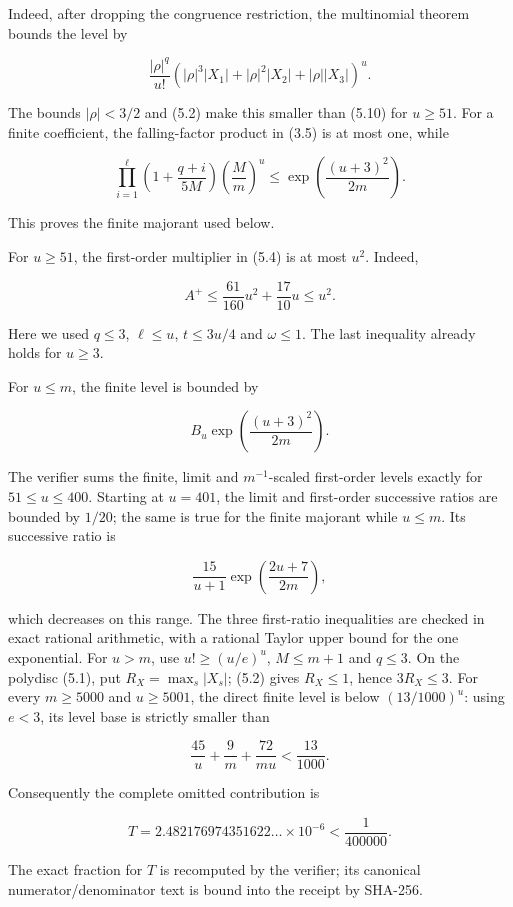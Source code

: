 \documentclass[
  11pt,
  a4paper,
]{article}
\begin{document}
Indeed, after dropping the congruence restriction, the multinomial
theorem bounds the level by

\[
\frac{|\rho|^q}{u!}
\left(|\rho|^3|X_1|+|\rho|^2|X_2|+|\rho||X_3|\right)^u.
\]

The bounds \(|\rho|<3/2\) and (5.2) make this smaller than (5.10) for
\(u\ge51\). For a finite coefficient, the falling-factor product in
(3.5) is at most one, while

\[
\prod_{i=1}^{\ell}\left(1+\frac{q+i}{5M}\right)
\left(\frac Mm\right)^u
\le
\exp\!\left(\frac{(u+3)^2}{2m}\right).
\]

This proves the finite majorant used below.

For \(u\ge51\), the first-order multiplier in (5.4) is at most \(u^2\).
Indeed,

\[
A^+\le \frac{61}{160}u^2+\frac{17}{10}u\le u^2.
\tag{5.11}
\]

Here we used \(q\le3\), \(\ell\le u\), \(t\le3u/4\) and \(\omega\le1\).
The last inequality already holds for \(u\ge3\).

For \(u\le m\), the finite level is bounded by

\[
B_u\exp\!\left(\frac{(u+3)^2}{2m}\right).
\tag{5.12}
\]

The verifier sums the finite, limit and \(m^{-1}\)-scaled first-order
levels exactly for \(51\le u\le400\). Starting at \(u=401\), the limit
and first-order successive ratios are bounded by \(1/20\); the same is
true for the finite majorant while \(u\le m\). Its successive ratio is

\[
\frac{15}{u+1}
\exp\!\left(\frac{2u+7}{2m}\right),
\]

which decreases on this range. The three first-ratio inequalities are
checked in exact rational arithmetic, with a rational Taylor upper bound
for the one exponential. For \(u>m\), use \(u!\ge(u/e)^u\), \(M\le m+1\)
and \(q\le3\). On the polydisc (5.1), put \(R_X=\max_s|X_s|\); (5.2)
gives \(R_X\le1\), hence \(3R_X\le3\). For every \(m\ge5000\) and
\(u\ge5001\), the direct finite level is below \((13/1000)^u\): using
\(e<3\), its level base is strictly smaller than

\[
\frac{45}{u}+\frac9m+\frac{72}{mu}<\frac{13}{1000}.
\]

Consequently the complete omitted contribution is

\[
T=2.482176974351622\ldots\times10^{-6}
<\frac1{400000}.
\tag{5.13}
\]

The exact fraction for \(T\) is recomputed by the verifier; its
canonical numerator/denominator text is bound into the receipt by
SHA-256.
\end{document}
